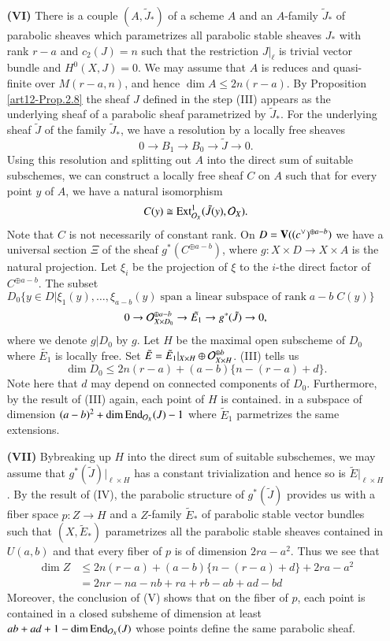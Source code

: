 \begin{itemize}
\item[\bf(VI)] There is a couple $(A, \tilde{J}_{*})$ of a scheme $A$ and an $A$-family $\tilde{J}_{*}$ of parabolic sheaves which parametrizes all parabolic stable sheaves $J_{*}$ with rank $r-a$ and $c_{2}(J)=n$ such that the restriction $J|_{\ell}$ is trivial vector bundle and $H^{0}(X, J)=0$. We may assume that $A$ is reduces and quasi-finite over $M(r-a, n)$, and hence $\dim A\leq 2n(r-a)$. By Proposition \ref{art12-Prop.2.8} the sheaf $J$ defined in the step (III) appears as the underlying sheaf of a parabolic sheaf parametrized by $\tilde{J}_{*}$. For the underlying sheaf $\tilde{J}$ of the family $\tilde{J}_{*}$, we have a resolution by a locally free sheaves
$$
0 \rightarrow B_{1} \rightarrow B_{0} \rightarrow \tilde{J} \rightarrow 0.
$$
Using this resolution and splitting out $A$ into the direct sum of suitable subschemes, we can construct a locally free sheaf $C$ on $A$ such that for every point $y$ of $A$,  we have a natural isomorphism
$$
C(y) \cong \operatorname{Ext}_{\mathcal{O}_{X}}^{1} (\tilde{J}(y), \mathcal{O}_{X}).
$$
Note that $C$ is not necessarily of constant rank. On $D=\break \bV( (c^{\vee})^{\oplus a-b})$ we have a universal section $\Xi$ of the sheaf $g^{*}(C^{\oplus a-b})$, where $g : X\times D \rightarrow X\times A$ is the natural projection. Let $\xi_{i}$ be the projection of $\xi$ to the $i$-the direct factor of $C^{\oplus a-b}$. The subset $D_{0}\{y \in D | \xi_{1}(y), \ldots, \xi_{a-b}(y)\; \text{span a linear subspace of rank}\; a-b\; C(y)\}$
$$
0 \rightarrow \mathcal{O}_{X\times D_{0}}^{\oplus a-b} \rightarrow \tilde{E_{1}} \rightarrow g^{*} (\tilde{J})\rightarrow 0,
$$
where we denote $g |D_{0}$ by $g$. Let $H$ be the maximal open subscheme of $D_{0}$ where $\tilde{E_{1}}$ is locally free. Set $\tilde{E} = \tilde{E}_{1}|_{X\times H} \oplus \mathcal{O}_{X \times H}^{\oplus b}$. (III) tells us
$$
\dim D_{0}\leq 2n(r-a) + (a-b) \{n-(r-a) + d\}.
$$
Note here that $d$ may depend on connected components of $D_{0}$. Furthermore, by the result of (III) again, each point of $H$ is contained. in a subspace of dimension $(a-b)^{2} + \dim \operatorname{End}_{\mathcal{O}_{X}}(J)-1$ where $\tilde{E}_{1}$ parmetrizes the same extensions.

\item[\bf(VII)] By\pageoriginale breaking up $H$ into the direct sum of suitable subschemes, we may assume that $g^{*}(\tilde{J})|_{\ell \times H}$ has a constant trivialization and hence so is $\tilde{E}|_{\ell\times H}$.
By the result of (IV), the parabolic structure of $g^{*}(\tilde{J})$ provides us with a fiber space $p : Z \rightarrow H$ and a $Z$-family $\tilde{E}_{*}$ of parabolic stable vector bundles such that $(X, \tilde{E}_{*})$ parametrizes all the parabolic stable sheaves contained in $U(a, b)$ and that every fiber of $p$ is of dimension $2ra-a^{2}$. Thus we see that
\begin{align*}
\dim Z &\leq 2n(r-a) + (a-b) \{n -(r-a) + d\} + 2ra-a^{2}\\
 &= 2nr-na -nb +ra +rb -ab + ad-bd
\end{align*}
 Moreover, the conclusion of (V) shows that on the fiber of $p$, each point is contained in a closed subsheme of dimension at least $ab + ad + 1-\dim \operatorname{End}_{\mathcal{O}_{X}}(J)$ whose points define the same parabolic sheaf.


\end{itemize}
